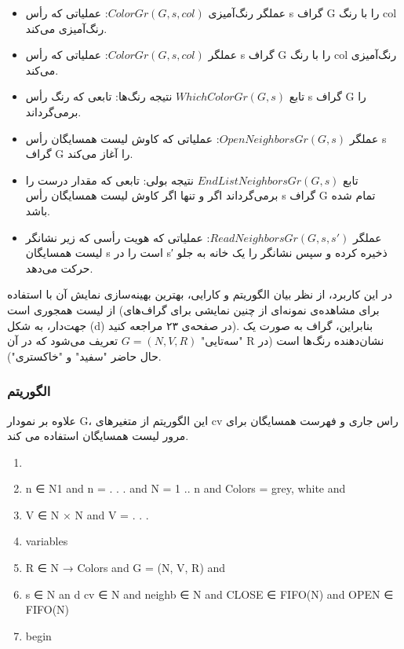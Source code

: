 \documentclass{book} %
\begin{document}
\begin{itemize}
    \item عملگر رنگ‌آمیزی‌ $ColorGr(G, s, col)$: عملیاتی که رأس s گراف G را با رنگ col رنگ‌آمیزی می‌کند.
   
    \item عملگر $ColorGr(G, s, col)$: عملیاتی که رأس s گراف G را با رنگ col رنگ‌آمیزی می‌کند.
    \item تابع $WhichColorGr(G, s)$ نتیجه رنگ‌ها: تابعی که رنگ رأس s گراف G را برمی‌گرداند.
    \item عملگر $OpenNeighborsGr(G, s)$: عملیاتی که کاوش لیست همسایگان رأس s گراف G را آغاز می‌کند.
    \item تابع $EndListNeighborsGr(G, s)$ نتیجه بولی: تابعی که مقدار درست را برمی‌گرداند اگر و تنها اگر کاوش لیست همسایگان رأس s گراف G تمام شده باشد.
    \item عملگر $ReadNeighborsGr(G, s, s′)$: عملیاتی که هویت رأسی که زیر نشانگر لیست همسایگان s است را در s′ ذخیره کرده و سپس نشانگر را یک خانه به جلو حرکت می‌دهد.
    
\end{itemize}

در این کاربرد، از نظر بیان الگوریتم و کارایی، بهترین بهینه‌سازی نمایش آن با استفاده از لیست همجوری است (برای مشاهده‌ی نمونه‌ای از چنین نمایشی برای گراف‌های جهت‌دار، به شکل (d) در صفحه‌ی ۲۳ مراجعه کنید). بنابراین، گراف به صورت یک "سه‌تایی" $G = (N, V, R)$ تعریف می‌شود که در آن R نشان‌دهنده رنگ‌ها است (در حال حاضر "سفید" و "خاکستری").

\subsubsection*{الگوریتم}

علاوه بر نمودار G، این الگوریتم از متغیرهای cv راس جاری و فهرست همسایگان برای مرور لیست همسایگان استفاده می کند.

\begin{latin}
    
    \begin{enumerate}
        
        \item 
        \item n ∈ N1 and n = . . . and N = 1 .. n and Colors = {grey, white} and
        \item V ∈ N × N and V = {. . .}
        \item variables
        \item R ∈ N → Colors and G = (N, V, R) and
        \item s ∈ N an d cv ∈ N and neighb ∈ N and CLOSE ∈ FIFO(N) and OPEN ∈ FIFO(N)
        \item begin
        
        
    \end{enumerate}
    
\end{latin}
\end{document}
